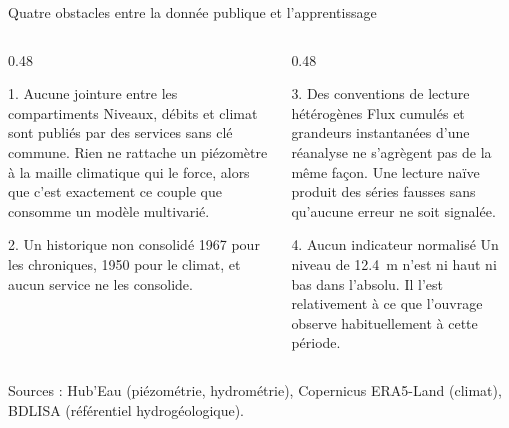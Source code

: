 \documentclass[aspectratio=169,11pt]{beamer}
\begin{document}
\begin{frame}{Quatre obstacles entre la donnée publique et l'apprentissage}

\small
\begin{columns}[T]
\begin{column}{0.48\textwidth}
\begin{apport}{1. Aucune jointure entre les compartiments}
Niveaux, débits et climat sont publiés par des services sans clé commune. Rien ne rattache un
piézomètre à la maille climatique qui le force, alors que c'est exactement ce couple que
consomme un modèle multivarié.
\end{apport}

\begin{apport}{2. Un historique non consolidé}
1967 pour les chroniques, 1950 pour le climat, et aucun service ne les consolide.
\end{apport}
\end{column}

\begin{column}{0.48\textwidth}
\begin{apport}{3. Des conventions de lecture hétérogènes}
Flux cumulés et grandeurs instantanées d'une réanalyse ne s'agrègent pas de la même façon. Une
lecture naïve produit des séries fausses sans qu'aucune erreur ne soit signalée.
\end{apport}

\begin{apport}{4. Aucun indicateur normalisé}
Un niveau de \SI{12,4}{\metre} n'est ni haut ni bas dans l'absolu. Il l'est relativement à ce
que l'ouvrage observe habituellement à cette période.
\end{apport}
\end{column}
\end{columns}

\vspace{0.3cm}
{\footnotesize\color{grisardoise} Sources : Hub'Eau (piézométrie, hydrométrie), Copernicus
ERA5-Land (climat), BDLISA (référentiel hydrogéologique).}
\end{frame}

\end{document}
